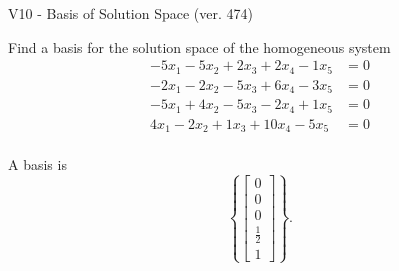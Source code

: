 \begin{exercise}
  \begin{exerciseTitle}V10 - Basis of Solution Space (ver. 474)\end{exerciseTitle}
  \begin{exerciseStatement}
    Find a basis for the solution space of the homogeneous system 
\begin{align*}
 -5 x_ 1 -5 x_ 2 + 2 x_ 3 + 2 x_ 4 -1 x_ 5 &= 0  \\ 
  -2 x_ 1 -2 x_ 2 -5 x_ 3 + 6 x_ 4 -3 x_ 5 &= 0  \\ 
  -5 x_ 1 + 4 x_ 2 -5 x_ 3 -2 x_ 4 + 1 x_ 5 &= 0  \\ 
  4 x_ 1 -2 x_ 2 + 1 x_ 3 + 10 x_ 4 -5 x_ 5 &= 0  \\ 
 \end{align*}


 
  \end{exerciseStatement}

  \begin{exerciseAnswer}
   A basis is   
\[\left\{\left[\begin{array}{c}
0 \\
0 \\
0 \\
\frac{1}{2} \\
1
\end{array}\right]\right\}.\]

  


  \end{exerciseAnswer}
\end{exercise}
